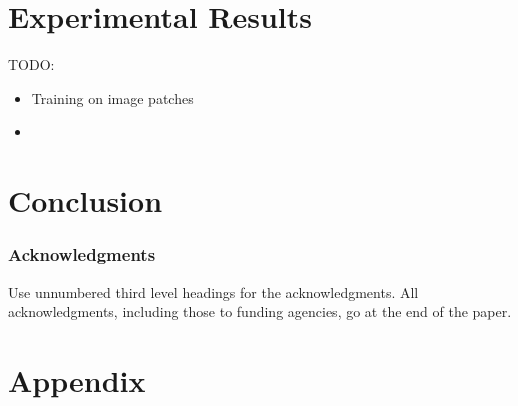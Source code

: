 \documentclass{article} %
\theoremstyle{plain}
\theoremstyle{definition}
\theoremstyle{remark}
\newcommand{\todo}[1]{{\color{red}\textbf{TODO:}``#1''}}
\begin{document}





\section{Experimental Results}

TODO:
\begin{itemize}
    \item Training on image patches
    \item 
\end{itemize}

\section{Conclusion}

\subsubsection*{Acknowledgments}
Use unnumbered third level headings for the acknowledgments. All
acknowledgments, including those to funding agencies, go at the end of the paper.





\appendix
\section{Appendix}
\end{document}
